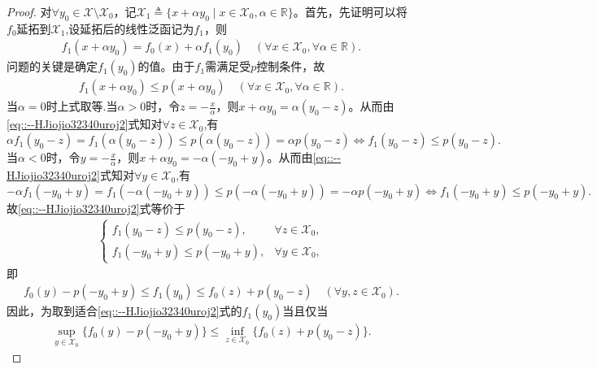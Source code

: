 \documentclass[../../main.tex]{subfiles}%
\begin{document}
\begin{proof}

对$\forall y_0 \in \mathscr{X} \setminus \mathscr{X}_0$，记$\mathscr{X}_1 \triangleq \{x + \alpha y_0 \mid x \in \mathscr{X}_0, \alpha \in \mathbb{R}\}$。首先，先证明可以将$f_0$延拓到$\mathscr{X}_1$,设延拓后的线性泛函记为$f_1$，则
\begin{align}\label{eqIOUHIO323847237894728947892}
f_1(x + \alpha y_0) = f_0(x) + \alpha f_1(y_0) \quad (\forall x \in \mathscr{X}_0, \forall \alpha \in \mathbb{R}).
\end{align}
问题的关键是确定$f_1(y_0)$的值。由于$f_1$需满足受$p$控制条件，故
\begin{align}
f_1(x + \alpha y_0) \leqslant p(x + \alpha y_0) \quad (\forall x \in \mathscr{X}_0, \forall \alpha \in \mathbb{R}). \label{eq::--HJiojio32340uroj2}
\end{align}
当$\alpha=0$时上式取等.当$\alpha >0$时，令$z=-\frac{x}{\alpha}$，则$x+\alpha y_0=\alpha \left( y_0-z \right)$。从而由\eqref{eq::--HJiojio32340uroj2}式知对$\forall z\in \mathscr{X}_0$,有
$$\alpha f_1\left( y_0-z \right) =f_1\left( \alpha \left( y_0-z \right) \right) \leqslant p\left( \alpha \left( y_0-z \right) \right) =\alpha p\left( y_0-z \right) \Longleftrightarrow f_1\left( y_0-z \right) \leqslant p\left( y_0-z \right) .$$
当$\alpha <0$时，令$y=-\frac{x}{\alpha}$，则$x+\alpha y_0=-\alpha \left( -y_0+y \right)$。从而由\eqref{eq::--HJiojio32340uroj2}式知对$\forall y\in \mathscr{X}_0$,有
$$-\alpha f_1\left( -y_0+y \right) =f_1\left( -\alpha \left( -y_0+y \right) \right) \leqslant p\left( -\alpha \left( -y_0+y \right) \right) =-\alpha p\left( -y_0+y \right) \Longleftrightarrow f_1\left( -y_0+y \right) \leqslant p\left( -y_0+y \right) .$$
故\eqref{eq::--HJiojio32340uroj2}式等价于
\begin{align*}
\begin{cases}
f_1(y_0 - z) \leqslant p(y_0 - z), & \forall z \in \mathscr{X}_0, \\
f_1(-y_0 + y) \leqslant p(-y_0 + y), & \forall y \in \mathscr{X}_0,
\end{cases}
\end{align*}
即
\begin{align*}
f_0(y) - p(-y_0 + y) \leqslant f_1(y_0) \leqslant f_0(z) + p(y_0 - z) \quad (\forall y, z \in \mathscr{X}_0).
\end{align*}
因此，为取到适合\eqref{eq::--HJiojio32340uroj2}式的$f_1(y_0)$当且仅当
\begin{align}
\sup_{y \in \mathscr{X}_0} \{f_0(y) - p(-y_0 + y)\} \leqslant \inf_{z \in \mathscr{X}_0} \{f_0(z) + p(y_0 - z)\}. \label{eq::--HJiojio32340uroj3}

\end{align}
\end{proof}
\end{document}
